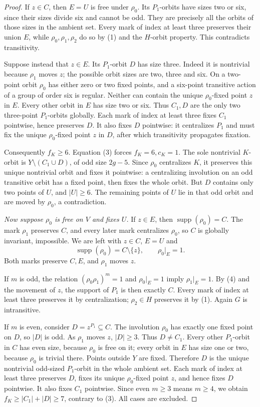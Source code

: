 \documentclass[11pt,a4paper]{article}
\begin{document}
\begin{proof}
If $z\in C$, then $E=U$ is free under $\rho_0$.
Its $P_1$-orbits have sizes two or six, since their sizes divide
six and cannot be odd. They are precisely all the orbits of those
sizes in the ambient set. Every mark of index at least three
preserves their union $E$, while $\rho_0,\rho_1,\rho_2$ do
so by (1) and the $H$-orbit property. This contradicts transitivity.

Suppose instead that $z\in E$. Its $P_1$-orbit $D$ has size
three. Indeed it is nontrivial because $\rho_1$ moves $z$;
the possible orbit sizes are two, three and six. On a two-point
orbit $\rho_0$ has either zero or two fixed points, and a
six-point transitive action of a group of order six is regular.
Neither can contain the unique $\rho_0$-fixed point $z$ in $E$.
Every other orbit in $E$ has size two or six. Thus $C_1,D$ are
the only two three-point $P_1$-orbits globally. Each mark of index
at least three fixes $C_1$ pointwise, hence preserves $D$.
It also fixes $D$ pointwise: it centralizes $P_1$ and must fix
the unique $\rho_0$-fixed point $z$ in $D$, after which
transitivity propagates fixation.

Consequently $f_K\ge6$. Equation (3) forces $f_K=6,c_K=1$.
The sole nontrivial $K$-orbit is $Y\setminus(C_1\cup D)$,
of odd size $2g-5$. Since $\rho_0$ centralizes $K$, it
preserves this unique nontrivial orbit and fixes it pointwise:
a centralizing involution on an odd transitive orbit has a fixed
point, then fixes the whole orbit. But $D$ contains only two
points of $U$, and $|U|\ge6$. The remaining points of $U$
lie in that odd orbit and are moved by $\rho_0$, a contradiction.

\emph{Now suppose $\rho_0$ is free on $V$ and fixes $U$.}
If $z\in E$, then $\operatorname{supp}(\rho_0)=C$.
The mark $\rho_1$ preserves $C$, and every later mark centralizes
$\rho_0$, so $C$ is globally invariant, impossible.
We are left with $z\in C$, $E=U$ and
\[
 \operatorname{supp}(\rho_0)=C\setminus\{z\},
 \qquad \rho_0|_E=1.                                  \tag{4}
\]
Both marks preserve $C,E$, and $\rho_1$ moves $z$.

If $m$ is odd, the relation $(\rho_0\rho_1)^m=1$ and
$\rho_0|_E=1$ imply $\rho_1|_E=1$. By (4) and the movement
of $z$, the support of $P_1$ is then exactly $C$.
Every mark of index at least three preserves it by centralization;
$\rho_2\in H$ preserves it by (1). Again $G$ is intransitive.

If $m$ is even, consider $D=z^{P_1}\subseteq C$.
The involution $\rho_0$ has exactly one fixed point on $D$,
so $|D|$ is odd. As $\rho_1$ moves $z$, $|D|\ge3$.
Thus $D\ne C_1$. Every other $P_1$-orbit in $C$ has even
size, because $\rho_0$ is free on it; every orbit in $E$ has
size one or two, because $\rho_0$ is trivial there. Points
outside $Y$ are fixed. Therefore $D$ is the unique nontrivial
odd-sized $P_1$-orbit in the whole ambient set.
Each mark of index at least three preserves $D$, fixes its
unique $\rho_0$-fixed point $z$, and hence fixes $D$ pointwise.
It also fixes $C_1$ pointwise. Since even $m\ge3$ means $m\ge4$,
we obtain $f_K\ge |C_1|+|D|\ge7$, contrary to (3).
All cases are excluded.
\end{proof}
\end{document}
